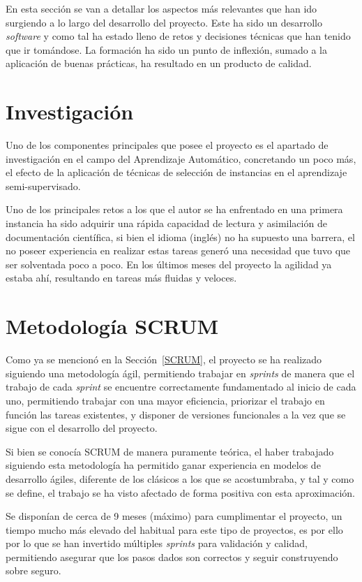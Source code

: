 
En esta sección se van a detallar los aspectos más relevantes que han ido surgiendo a lo largo del desarrollo del proyecto. Este ha sido un desarrollo \textit{software} y como tal ha estado lleno de retos y decisiones técnicas que han tenido que ir tomándose. La formación ha sido un punto de inflexión, sumado a la aplicación de buenas prácticas, ha resultado en un producto de calidad.


\section{Investigación}
Uno de los componentes principales que posee el proyecto es el apartado de investigación en el campo del Aprendizaje Automático, concretando un poco más, el efecto de la aplicación de técnicas de selección de instancias en el aprendizaje semi-supervisado.

Uno de los principales retos a los que el autor se ha enfrentado en una primera instancia ha sido adquirir una rápida capacidad de lectura y asimilación de documentación científica, si bien el idioma (inglés) no ha supuesto una barrera, el no poseer experiencia en realizar estas tareas  generó una necesidad que tuvo que ser solventada poco a poco. En los últimos meses del proyecto la agilidad ya estaba ahí, resultando en tareas más fluidas y veloces.

\section{Metodología SCRUM}
Como ya se mencionó en la Sección~\ref{SCRUM}, el proyecto se ha realizado siguiendo una metodología ágil, permitiendo trabajar en \textit{sprints} de manera que el trabajo de cada \textit{sprint} se encuentre correctamente fundamentado al inicio de cada uno, permitiendo trabajar con una mayor eficiencia, priorizar el trabajo en función las tareas existentes, y disponer de versiones funcionales a la vez que se sigue con el desarrollo del proyecto.

Si bien se conocía SCRUM de manera puramente teórica, el haber trabajado siguiendo esta metodología ha permitido ganar experiencia en modelos de desarrollo ágiles, diferente de los clásicos a los que se acostumbraba, y tal y como se define, el trabajo se ha visto afectado de forma positiva con esta aproximación.

Se disponían de cerca de 9 meses (máximo) para cumplimentar el proyecto, un tiempo mucho más elevado del habitual para este tipo de proyectos, es por ello por lo que se han invertido múltiples \textit{sprints} para validación y calidad, permitiendo asegurar que los pasos dados son correctos y seguir construyendo sobre seguro.

